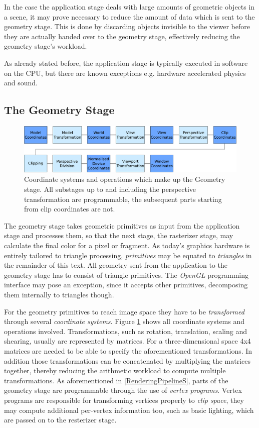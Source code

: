 In the case the application stage deals with large amounts of geometric
objects in a scene, it may prove necessary to reduce the amount of data which
is sent to the geometry stage. This is done by discarding objects invisible to
the viewer before they are actually handed over to the geometry stage,
effectively reducing the geometry stage's workload.

As already stated before, the application stage is typically executed in
software on the CPU, but there are known exceptions e.g. hardware accelerated
physics and sound.

\subsection{The Geometry Stage}

\begin{figure}
\begin{center}
\includegraphics[scale=0.5]{Images/Geometry-Stage.pdf}
\caption[The Geometry Stage]{Coordinate systems and operations which make up the
Geometry stage. All substages up to and including the perspective transformation
are programmable, the subsequent parts starting from clip coordinates are not.}
\label{fig:GeometryStage}
\end{center}
\end{figure}

The geometry stage takes geometric primitives as input from the application
stage and processes them, so that the next stage, the rasterizer stage, may
calculate the final color for a pixel or fragment. As today's graphics
hardware is entirely tailored to triangle processing, \textit{primitives} may 
be equated to \textit{triangles} in the remainder of this text. All geometry
sent from the application to the geometry stage has to consist of triangle
primitives. The \textit{OpenGL} programming interface may pose an exception,
since it accepts other primitives, decomposing them internally to triangles
though.

For the geometry primitives to reach image space they have to be
\textit{transformed} through several \textit{coordinate systems}. Figure
\ref{fig:GeometryStage} shows all coordinate systems and operations
involved. Transformations, such as rotation, translation, scaling and shearing,
usually are represented by matrices. For a three-dimensional space 4x4 matrices
are needed to be able to specify the aforementioned transformations. In addition
those transformations can be concatenated by multiplying the matrices together,
thereby reducing the arithmetic workload to compute multiple transformations.
As aforementioned in \ref{RenderingPipelineS}, parts of the geometry stage are
programmable through the use of \textit{vertex programs}. Vertex programs are
responsible for transforming vertices properly to \textit{clip space}, they
may compute additional per-vertex information too, such as basic lighting, which
are passed on to the resterizer stage.

